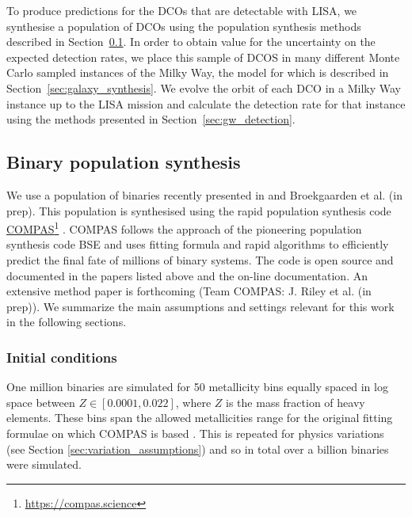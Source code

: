 To produce predictions for the DCOs that are detectable with LISA, we synthesise a population of DCOs using the population synthesis methods described in Section~\ref{sec:COMPAS_explained}. In order to obtain value for the uncertainty on the expected detection rates, we place this sample of DCOS in many different Monte Carlo sampled instances of the Milky Way, the model for which is described in Section~\ref{sec:galaxy_synthesis}. We evolve the orbit of each DCO in a Milky Way instance up to the LISA mission and calculate the detection rate for that instance using the methods presented in Section~\ref{sec:gw_detection}.

\subsection{Binary population synthesis}\label{sec:COMPAS_explained}

We use a population of binaries recently presented in \citet{Broekgaarden+2021} and Broekgaarden et al. (in prep). This population is synthesised using the rapid population synthesis code \href{https://compas.science}{COMPAS}\footnote{\url{https://compas.science}} \citep{Stevenson+2017, Vigna-Gomez+2018, Stevenson+2019}. COMPAS follows the approach of the pioneering population synthesis code BSE \citep{Hurley+2000,Hurley+2002} and uses fitting formula and rapid algorithms to efficiently predict the final fate of millions of binary systems. The code is open source and documented in the papers listed above and the on-line documentation. An extensive method paper is forthcoming (Team COMPAS: J. Riley et al. (in prep)). We summarize the main assumptions and settings relevant for this work in the following sections.

\subsubsection{Initial conditions}

One million binaries are simulated for 50 metallicity bins equally spaced in log space between $Z \in [0.0001, 0.022]$, where $Z$ is the mass fraction of heavy elements. These bins span the allowed metallicities range for the original fitting formulae on which COMPAS is based \citep{Hurley+2000}. This is repeated for \nMinusOneModels{} physics variations (see Section \ref{sec:variation_assumptions}) and so in total over a billion binaries were simulated.

